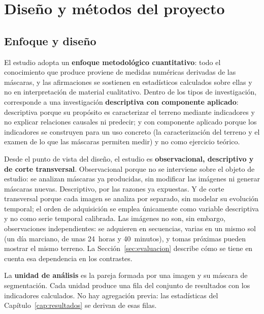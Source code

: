 \chapter{Diseño y métodos del proyecto}
\label{cap:metodos}

\section{Enfoque y diseño}

El estudio adopta un \textbf{enfoque metodológico cuantitativo}: todo el conocimiento que
produce proviene de medidas numéricas derivadas de las máscaras, y las afirmaciones se
sostienen en estadísticos calculados sobre ellas y no en interpretación de material
cualitativo. Dentro de los tipos de investigación, corresponde a una investigación
\textbf{descriptiva con componente aplicado}: descriptiva porque su propósito es
caracterizar el terreno mediante indicadores y no explicar relaciones causales ni predecir;
y con componente aplicado porque los indicadores se construyen para un uso concreto (la
caracterización del terreno y el examen de lo que las máscaras permiten medir) y no como
ejercicio teórico.

Desde el punto de vista del diseño, el estudio es \textbf{observacional, descriptivo y de
corte transversal}. Observacional
porque no se interviene sobre el objeto de estudio: se analizan máscaras ya producidas, sin
modificar las imágenes ni generar máscaras nuevas. Descriptivo, por las razones ya expuestas.
Y de corte transversal porque cada imagen se analiza por separado, sin modelar su
evolución temporal; el orden de adquisición se emplea únicamente como variable descriptiva y no
como serie temporal calibrada. Las imágenes no son, sin embargo, observaciones independientes:
se adquieren en secuencias, varias en un mismo sol (un día marciano, de unas 24~horas y 40~minutos), y tomas próximas pueden mostrar el mismo
terreno. La Sección~\ref{sec:evaluacion} describe cómo se tiene en cuenta esa dependencia en
los contrastes.

La \textbf{unidad de análisis} es la pareja formada por una imagen y su máscara de
segmentación. Cada unidad produce una fila del conjunto de resultados con los indicadores
calculados. No hay agregación previa: las estadísticas del
Capítulo~\ref{cap:resultados} se derivan de esas filas.


